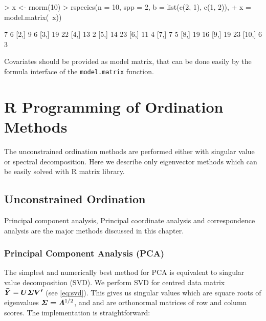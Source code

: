 \begin{Schunk}
\begin{Sinput}
> x <- rnorm(10)
> rspecies(n = 10, spp = 2, b = list(c(2, 1), c(1, 2)), 
+     x = model.matrix(~x))
\end{Sinput}
\begin{Soutput}
      [,1] [,2]
 [1,]    7    6
 [2,]    9    6
 [3,]   19   22
 [4,]   13    2
 [5,]   14   23
 [6,]   11    4
 [7,]    7    5
 [8,]   19   16
 [9,]   19   23
[10,]    6    3
\end{Soutput}
\end{Schunk}
Covariates should be provided as model matrix, that can be done easily by the
formula interface of the \texttt{model.matrix} function.

\section{R Programming of Ordination Methods}

The unconstrained ordination methods are performed either with
singular value or spectral decomposition. Here we describe only
eigenvector methods which can be easily solved with R matrix library.

\subsection{Unconstrained Ordination}

Principal component analysis, Principal coordinate analysis and correspondence analysis are the major methods discussed in this chapter.

\subsubsection{Principal Component Analysis (PCA)}

The simplest and numerically best method for PCA is equivalent to
singular value decomposition (SVD).  We perform SVD for centred data
matrix $\vec{\bar Y} = \vec{U \bSigma V'}$ (see \ref{eq:svd}).  This
gives us singular values which are square roots of eigenvalues
$\vec{\bSigma = \bLambda}^{1/2}$, and  and  are
orthonormal matrices of row and column scores.  The implementation is
straightforward:

